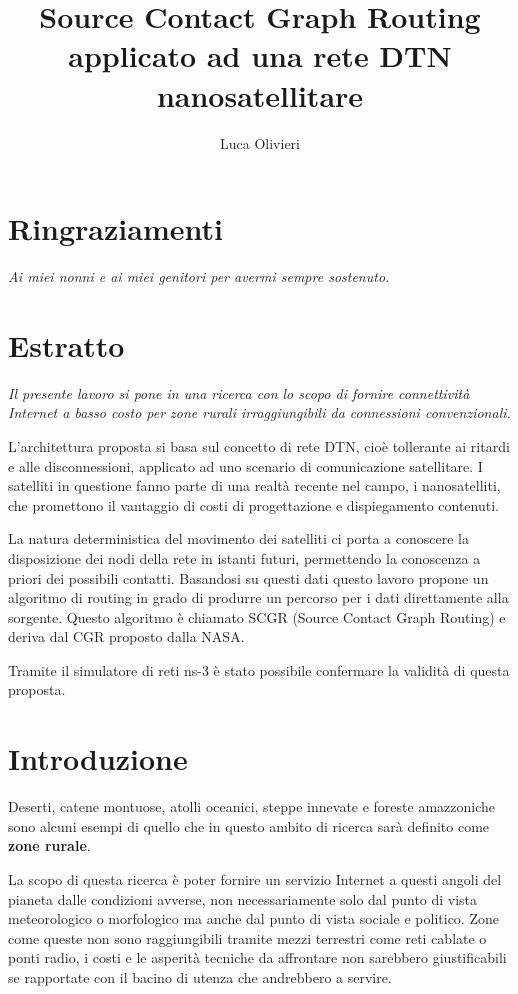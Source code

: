 \documentclass[12pt,a4paper,oneside]{book}
\author{Luca Olivieri}
\title{Source Contact Graph Routing applicato ad una rete DTN nanosatellitare}
\begin{document}
	
	
	
	\clearpage
	
	\chapter*{Ringraziamenti}	
	\textit{Ai miei nonni e ai miei genitori per avermi sempre sostenuto.}
	\clearpage
	
	\chapter*{Estratto}
	{ \it Il presente lavoro si pone in una ricerca con lo scopo di fornire connettività Internet a basso costo per zone rurali irraggiungibili da connessioni convenzionali.
	
	L'architettura proposta si basa sul concetto di rete DTN, cioè tollerante ai ritardi e alle disconnessioni, applicato ad uno scenario di comunicazione satellitare. I satelliti in questione fanno parte di una realtà recente nel campo, i nanosatelliti, che promettono il vantaggio di costi di progettazione e dispiegamento contenuti.
	
	La natura deterministica del movimento dei satelliti ci porta a conoscere la disposizione dei nodi della rete in istanti futuri, permettendo la conoscenza a priori dei possibili contatti.
	Basandosi su questi dati questo lavoro propone un algoritmo di routing in grado di produrre un percorso per i dati direttamente alla sorgente. Questo algoritmo è chiamato SCGR (Source Contact Graph Routing) e deriva dal CGR proposto dalla NASA.
	
	Tramite il simulatore di reti ns-3 è stato possibile confermare la validità di questa proposta.}
	\clearpage
	
	\tableofcontents
	
	
	
	\chapter*{Introduzione}
	Deserti, catene montuose, atolli oceanici, steppe innevate e foreste amazzoniche sono alcuni esempi di quello che in questo ambito di ricerca sarà definito come \textbf{zone rurale}. 
	
	La scopo di questa ricerca è poter fornire un servizio Internet a questi angoli del pianeta dalle condizioni avverse, non necessariamente solo dal punto di vista meteorologico o morfologico ma anche dal punto di vista sociale e politico. Zone come queste non sono raggiungibili tramite mezzi terrestri come reti cablate o ponti radio, i costi e le asperità tecniche da affrontare non sarebbero giustificabili se rapportate con il bacino di utenza che andrebbero a servire. 
	
\end{document}
